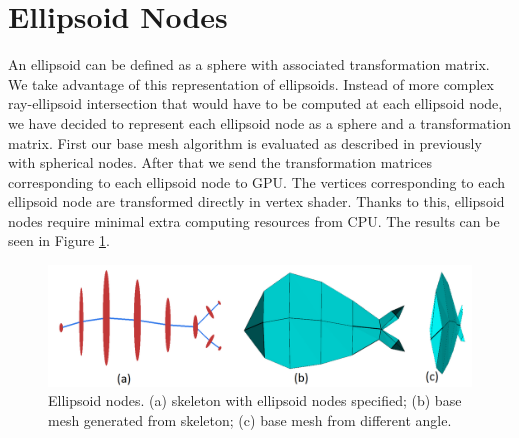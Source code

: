 \section{Ellipsoid Nodes}
An ellipsoid can be defined as a sphere with associated transformation matrix.
We take advantage of this representation of ellipsoids.
Instead of more complex ray-ellipsoid intersection that would have to be computed at each ellipsoid node, we have decided to represent each ellipsoid node as a sphere and a transformation matrix.
First our base mesh algorithm is evaluated as described in previously with spherical nodes.
After that we send the transformation matrices corresponding to each ellipsoid node to GPU.
The vertices corresponding to each ellipsoid node are transformed directly in vertex shader.
Thanks to this, ellipsoid nodes require minimal extra computing resources from CPU.
The results can be seen in Figure \ref{fig:ellipsoid_ilu}.

\begin{figure}[ht]
    \centering
    \includegraphics[width=\linewidth]{images/ellipsoid_fish_ilu}
    \caption[Ellipsoid nodes]{Ellipsoid nodes. (a) skeleton with ellipsoid nodes specified; (b) base mesh generated from skeleton; (c) base mesh from different angle.}
    \label{fig:ellipsoid_ilu}
\end{figure}

